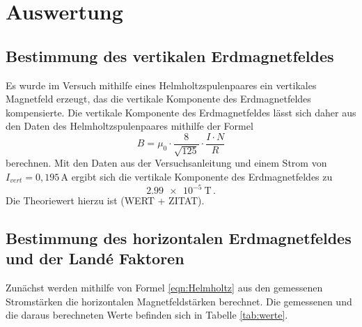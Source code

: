 \newpage
\section{Auswertung}
\label{sec:Auswertung}

\subsection{Bestimmung des vertikalen Erdmagnetfeldes}
\label{subsec:vertikal}

Es wurde im Versuch mithilfe eines Helmholtzspulenpaares ein vertikales Magnetfeld
erzeugt, das die vertikale Komponente des Erdmagnetfeldes kompensierte. Die vertikale
Komponente des Erdmagnetfeldes lässt sich daher aus den Daten des Helmholtzspulenpaares
mithilfe der Formel
\begin{equation}
    B= \mu_0 \cdot  \frac{8}{\sqrt {125}}\cdot \frac{I\cdot N}{R}
    \label{eqn:Helmholtz}
\end{equation}
berechnen. Mit den Daten aus der Versuchsanleitung \cite{Versuchsanleitung} und einem Strom von
$I_{vert}=0{,}195\,$A ergibt sich die vertikale Komponente des Erdmagnetfeldes zu
\begin{equation*}
  \SI{2.99e-5}{\tesla}\,.
\end{equation*}
Die Theoriewert hierzu ist (WERT + ZITAT).

\subsection{Bestimmung des horizontalen Erdmagnetfeldes und der Landé Faktoren}
\label{subsec:horizontal}

Zunächst werden mithilfe von Formel \eqref{eqn:Helmholtz} aus den gemessenen Stromstärken
die horizontalen Magnetfeldstärken berechnet. Die gemessenen und die daraus berechneten Werte befinden sich
in Tabelle \ref{tab:werte}.

